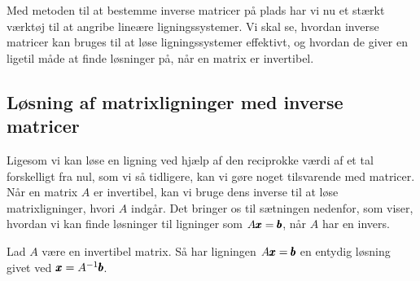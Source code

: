 Med metoden til at bestemme inverse matricer på plads har vi nu et stærkt værktøj til at angribe lineære ligningssystemer. Vi skal se, hvordan inverse matricer kan bruges til at løse ligningssystemer effektivt, og hvordan de giver en ligetil måde at finde løsninger på, når en matrix er invertibel.

\subsection*{Løsning af matrixligninger med inverse matricer}
Ligesom vi kan løse en ligning ved hjælp af den reciprokke værdi af et tal forskelligt fra nul, som vi så tidligere, kan vi gøre noget tilsvarende med matricer. Når en matrix \( A \) er invertibel, kan vi bruge dens inverse til at løse matrixligninger, hvori \( A \) indgår. Det bringer os til sætningen nedenfor, som viser, hvordan vi kan finde løsninger til ligninger som \( A \pmb{x} = \pmb{b} \), når \( A \) har en invers.

\begin{theorem}
    Lad \( A \) være en invertibel matrix. Så har ligningen \( A \pmb{x} = \pmb{b} \) en entydig løsning givet ved \( \pmb{x} = A^{-1} \pmb{b} \).
\end{theorem}

